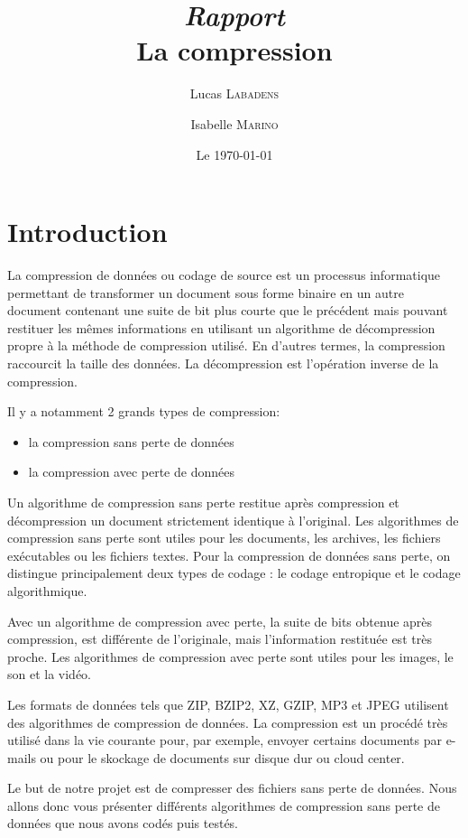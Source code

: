 \documentclass{report}
\title{\textit{Rapport} \\ La compression}
\author{Lucas \textsc{Labadens} \and Isabelle \textsc{Marino} }
\date{Le \today}
\begin{document}
\maketitle
 

\section*{Introduction}
La compression de données ou codage de source est un processus informatique permettant de transformer un document sous forme binaire en un autre document contenant une suite de bit plus courte que le précédent mais pouvant restituer les mêmes informations en utilisant un algorithme de décompression propre à la méthode de compression  utilisé. En d'autres termes, la compression raccourcit la taille des données. La décompression est l'opération inverse de la compression.

Il y a notamment 2 grands types de compression:
\begin{itemize}
\item la compression sans perte de données
\item la compression avec perte de données
\end{itemize}

Un algorithme de compression sans perte restitue après compression et décompression un document strictement identique à l'original. Les algorithmes de compression sans perte sont utiles pour les documents, les archives, les fichiers exécutables ou les fichiers textes.
Pour la compression de données sans perte, on distingue principalement deux types de codage : le codage entropique et le codage algorithmique.

Avec un algorithme de compression avec perte, la suite de bits obtenue après  compression,  est différente de l'originale, mais l'information restituée est très proche. Les algorithmes de compression avec perte sont utiles pour les images, le son et la vidéo.

Les formats de données tels que ZIP, BZIP2, XZ, GZIP, MP3 et JPEG utilisent des algorithmes de compression de données.
La compression est un procédé très utilisé dans la vie courante pour, par exemple, envoyer certains documents par e-mails ou pour le skockage de documents sur disque dur ou cloud center.
  
Le but de notre projet est de compresser des fichiers sans perte de données. 
Nous allons donc vous présenter différents algorithmes de compression sans perte de données que nous avons codés puis testés.
\end{document}
